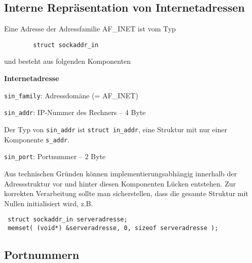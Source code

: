\documentclass[12pt,utf8]{article}
\begin{document}
\subsection*{Interne Repräsentation von Internetadressen}

Eine Adresse der Adressfamilie AF\_INET ist vom Typ
\begin{verbatim}
        struct sockaddr_in
\end{verbatim}
und besteht aus folgenden Komponenten



\begin{center}
{\bf Internetadresse}

\end{center}

\begin{titemize}
\item {\tt sin\_family}: Adressdomäne (= AF\_INET)
\item {\tt sin\_addr}: IP-Nummer des Rechners -- 4 Byte

  Der Typ von {\tt sin\_addr} ist {\tt struct in\_addr}, eine Struktur mit
  nur einer Komponente {\tt s\_addr}.

\item {\tt sin\_port}: Portnummer -- 2 Byte
\end{titemize}

Aus technischen Gründen können implementierungsabhängig innerhalb der
Adressstruktur vor und hinter diesen Komponenten Lücken entstehen.
Zur korrekten Verarbeitung sollte man sicherstellen, dass die
gesamte Struktur mit Nullen initialisiert wird, z.B.

\begin{verbatim}
 struct sockaddr_in serveradresse;
 memset( (void*) &serveradresse, 0, sizeof serveradresse );
\end{verbatim}


\subsection*{Portnummern }
\end{document}
